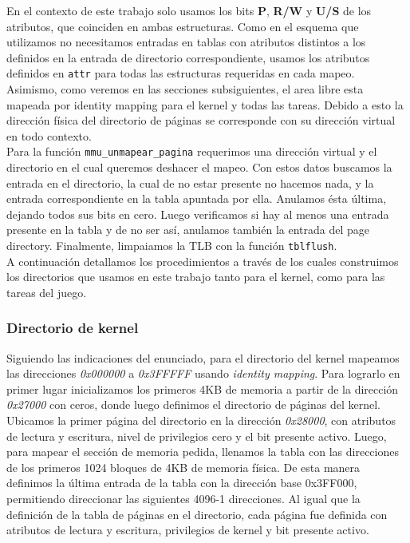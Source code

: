 En el contexto de este trabajo solo usamos los bits \textbf{P}, \textbf{R/W} y \textbf{U/S} de los atributos, que coinciden en ambas estructuras. 
Como en el esquema que utilizamos no necesitamos entradas en tablas con atributos distintos a los definidos en la entrada de directorio correspondiente, usamos los atributos definidos en \verb|attr| para todas las estructuras requeridas en cada mapeo.
Asimismo, como veremos en las secciones subsiguientes, el area libre esta mapeada por identity mapping para el kernel y todas las tareas. Debido a esto la dirección física del directorio de páginas se corresponde con su dirección virtual en todo contexto.\\

Para la función \verb|mmu_unmapear_pagina| requerimos una dirección virtual y el directorio en el cual queremos deshacer el mapeo. 
Con estos datos buscamos la entrada en el directorio, la cual de no estar presente no hacemos nada, y la entrada correspondiente en la tabla apuntada por ella.
Anulamos ésta última, dejando todos sus bits en cero. 
Luego verificamos si hay al menos una entrada presente en la tabla y de no ser así, anulamos también la entrada del page directory.
Finalmente, limpaiamos la TLB con la función \verb|tblflush|.\\

A continuación detallamos los procedimientos a través de los cuales construimos los directorios que usamos en este trabajo tanto para el kernel, como para las tareas del juego.


\subsubsection{Directorio de kernel}
Siguiendo las indicaciones del enunciado, para el directorio del kernel mapeamos las direcciones \textit{0x000000} a \textit{0x3FFFFF} usando \textit{identity mapping}.
Para lograrlo en primer lugar inicializamos los primeros 4KB de memoria a partir de la dirección \textit{0x27000} con ceros, donde luego definimos el directorio de páginas del kernel.
Ubicamos la primer página del directorio en la dirección \textit{0x28000}, con atributos de lectura y escritura, nivel de privilegios cero y el bit presente activo.
Luego, para mapear el sección de memoria pedida, llenamos la tabla con las direcciones de los primeros 1024 bloques de 4KB de memoria física. 
De esta manera definimos la última entrada de la tabla con la dirección base 0x3FF000, permitiendo direccionar las siguientes 4096-1 direcciones. 
Al igual que la definición de la tabla de páginas en el directorio, cada página fue definida con atributos de lectura y escritura, privilegios de kernel y bit presente activo.

